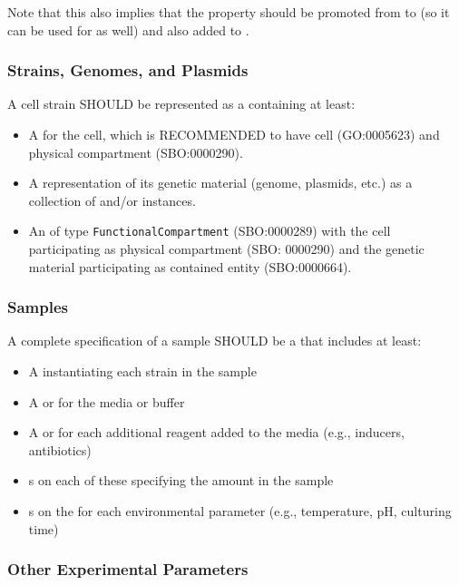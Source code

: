 Note that this also implies that the  property should be promoted from  to  (so it can be used for  as well) and also added to .

\subsubsection{Strains, Genomes, and Plasmids}

A cell strain SHOULD be represented as a  containing at least:
\begin{itemize}
\item A  for the cell, which is RECOMMENDED to have  cell (GO:0005623) and  physical compartment (SBO:0000290).
\item A representation of its genetic material (genome, plasmids, etc.) as a collection of  and/or  instances.
\item An  of type \texttt{FunctionalCompartment} (SBO:0000289) with the cell participating as physical compartment (SBO: 0000290) and the genetic material participating as contained entity (SBO:0000664).
\end{itemize}

\subsubsection{Samples}

A complete specification of a sample SHOULD be a  that includes at least:
\begin{itemize}
\item A  instantiating each strain in the sample
\item A  or  for the media or buffer
\item A  or  for each additional reagent added to the media (e.g., inducers, antibiotics)
\item {}s on each of these specifying the amount in the sample
\item {}s on the  for each environmental parameter (e.g., temperature, pH, culturing time)
\end{itemize}

\subsubsection{Other Experimental Parameters}

